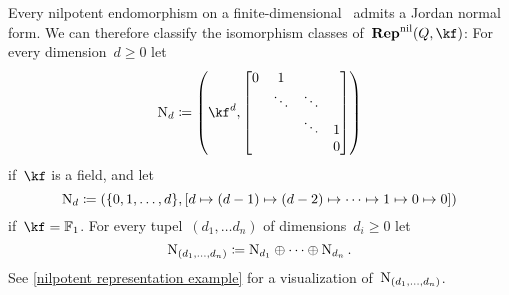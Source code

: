 \documentclass[a4paper,11pt]{scrartcl}
\begin{document}
Every nilpotent endomorphism on a finite-dimensional~\vectorspace{$\kf$} admits a Jordan normal form.
We can therefore classify the isomorphism classes of~$\Repnil(Q, \kf)$:
For every dimension~$d \geq 0$ let
\[
  \Nil_d
  \defined
  \left(
    \kf^d,
    \begin{bmatrix}
      0 & 1       &         &   \\
        & \ddots  & \ddots  &   \\
        &         & \ddots  & 1 \\
        &         &         & 0
    \end{bmatrix}
  \right)
\]
if~$\kf$ is a field, and let
\[
  \mathrm{N}_d
  \coloneqq
  (
    \{ 0, 1, \dotsc, d \},
    [d \mapsto (d-1) \mapsto (d-2) \mapsto \dotsb \mapsto 1 \mapsto 0 \mapsto 0]
  )
\]
if~$\kf = \Finite_1$.
For every tupel~$(d_1, \dotsc d_n)$ of dimensions~$d_i \geq 0$ let
\[
  \mathrm{N}_{(d_1, \dotsc, d_n)}
  \coloneqq
  \mathrm{N}_{d_1} \oplus \dotsb \oplus \mathrm{N}_{d_n} \,.
\]
See \cref{nilpotent representation example} for a visualization of~$\mathrm{N}_{(d_1, \dotsc, d_n)}$.
\end{document}
